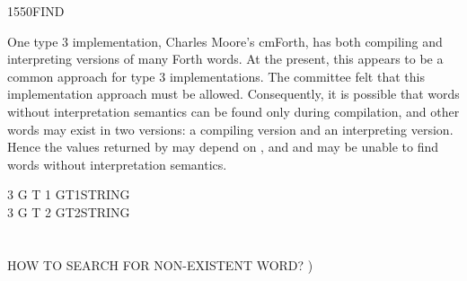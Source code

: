 \begin{worddef}{1550}{FIND}
\begin{rationale}
		One type 3 implementation, Charles Moore's cmForth, has both
		compiling and interpreting versions of many Forth words. At the
		present, this appears to be a common approach for type 3
		implementations. The committee felt that this implementation
		approach must be allowed. Consequently, it is possible that
		words without interpretation semantics can be found only during
		compilation, and other words may exist in two versions: a
		compiling version and an interpreting version. Hence the values
		returned by  may depend on , and 
		and \word{[']} may be unable to find words without
		interpretation semantics.
	\end{rationale}

	\begin{testing} %
		\ttfamily
			3 
			 G 
			 T 
			 1 
			 GT1STRING \\
			3 
			 G 
			 T 
			 2 
			 GT2STRING \\
		 \\
		 \\
		 HOW TO SEARCH FOR NON-EXISTENT WORD? )
	\end{testing}
\end{worddef}


